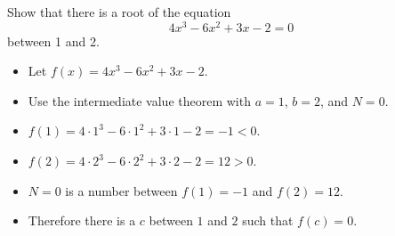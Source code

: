 \begin{frame}
\begin{example}
Show that there is a root of the equation
\[
4x^3 - 6x^2 + 3x - 2 = 0
\]
between 1 and 2.
\begin{itemize}
\item<2->  Let $f(x) = 4x^3 - 6x^2 + 3x - 2$.
\item<3->  Use the intermediate value theorem with $a = 1$, $b = 2$, and $N = 0$.
\item<4->  $f(1) = 4\cdot 1^3 - 6\cdot 1^2 + 3\cdot 1 - 2 = -1 < 0$.
\item<5->  $f(2) = 4\cdot 2^3 - 6\cdot 2^2 + 3\cdot 2 - 2 = 12 > 0$.
\item<6->  $N = 0$ is a number between $f(1) = -1$ and $f(2) = 12$.
\item<7->  Therefore there is a $c$ between $1$ and $2$ such that $f(c) = 0$.
\end{itemize}
\end{example}
\end{frame}
